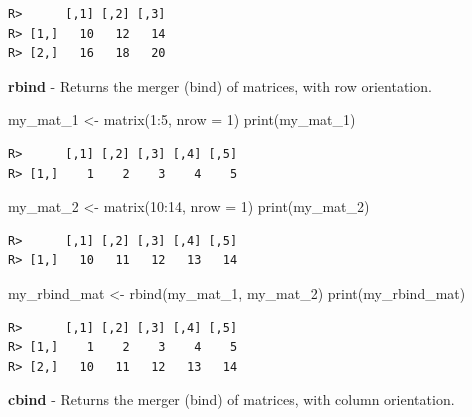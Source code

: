 \documentclass[
  12pt,
]{book}
\newenvironment{Shaded}{\begin{snugshade}}{\end{snugshade}}
\newcommand{\AttributeTok}[1]{\textcolor[rgb]{0.61,0.61,0.61}{#1}}
\newcommand{\DecValTok}[1]{\textcolor[rgb]{0.06,0.06,0.06}{#1}}
\newcommand{\FunctionTok}[1]{\textcolor[rgb]{0,0,0}{#1}}
\newcommand{\NormalTok}[1]{#1}
\newcommand{\OtherTok}[1]{\textcolor[rgb]{0.37,0.37,0.37}{#1}}
\newcommand{\SpecialCharTok}[1]{\textcolor[rgb]{0,0,0}{#1}}
\begin{document}
\begin{verbatim}
R>      [,1] [,2] [,3]
R> [1,]   10   12   14
R> [2,]   16   18   20
\end{verbatim}

\textbf{rbind} - Returns the merger (bind) of matrices, with row orientation. 

\begin{Shaded}
\begin{Highlighting}[]
\NormalTok{my\_mat\_1 }\OtherTok{\textless{}{-}} \FunctionTok{matrix}\NormalTok{(}\DecValTok{1}\SpecialCharTok{:}\DecValTok{5}\NormalTok{, }\AttributeTok{nrow =} \DecValTok{1}\NormalTok{)}
\FunctionTok{print}\NormalTok{(my\_mat\_1)}
\end{Highlighting}
\end{Shaded}

\begin{verbatim}
R>      [,1] [,2] [,3] [,4] [,5]
R> [1,]    1    2    3    4    5
\end{verbatim}

\begin{Shaded}
\begin{Highlighting}[]
\NormalTok{my\_mat\_2 }\OtherTok{\textless{}{-}} \FunctionTok{matrix}\NormalTok{(}\DecValTok{10}\SpecialCharTok{:}\DecValTok{14}\NormalTok{, }\AttributeTok{nrow =} \DecValTok{1}\NormalTok{)}
\FunctionTok{print}\NormalTok{(my\_mat\_2)}
\end{Highlighting}
\end{Shaded}

\begin{verbatim}
R>      [,1] [,2] [,3] [,4] [,5]
R> [1,]   10   11   12   13   14
\end{verbatim}

\begin{Shaded}
\begin{Highlighting}[]
\NormalTok{my\_rbind\_mat }\OtherTok{\textless{}{-}} \FunctionTok{rbind}\NormalTok{(my\_mat\_1, my\_mat\_2)}
\FunctionTok{print}\NormalTok{(my\_rbind\_mat)}
\end{Highlighting}
\end{Shaded}

\begin{verbatim}
R>      [,1] [,2] [,3] [,4] [,5]
R> [1,]    1    2    3    4    5
R> [2,]   10   11   12   13   14
\end{verbatim}

\textbf{cbind} - Returns the merger (bind) of matrices, with column orientation. 
\end{document}
